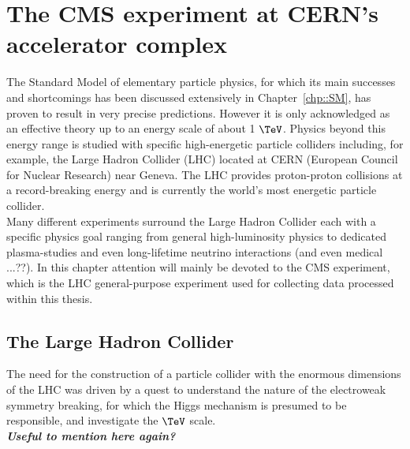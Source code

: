 \chapter{The CMS experiment at CERN's accelerator complex} \label{chp:CERN}

The Standard Model of elementary particle physics, for which its main successes and shortcomings has been discussed extensively in Chapter~\ref{chp::SM}, has proven to result in very precise predictions. However it is only acknowledged as an effective theory up to an energy scale of about 1 $\TeV$. Physics beyond this energy range is studied with specific high-energetic particle colliders including, for example, the Large Hadron Collider (LHC) located at CERN (European Council for Nuclear Research) near Geneva. The LHC provides proton-proton collisions at a record-breaking energy and is currently the world's most energetic particle collider.\\
Many different experiments surround the Large Hadron Collider each with a specific physics goal ranging from general high-luminosity physics to dedicated plasma-studies and even long-lifetime neutrino interactions (and even medical ...??).
In this chapter attention will mainly be devoted to the CMS experiment, which is the LHC general-purpose experiment used for collecting data processed within this thesis.

\section{The Large Hadron Collider}
The need for the construction of a particle collider with the enormous dimensions of the LHC was driven by a quest to understand the nature of the electroweak symmetry breaking, for which the Higgs mechanism is presumed to be responsible, and investigate the $\TeV$ scale.
\\
\textit{\textbf{Useful to mention here again?}}
\\

